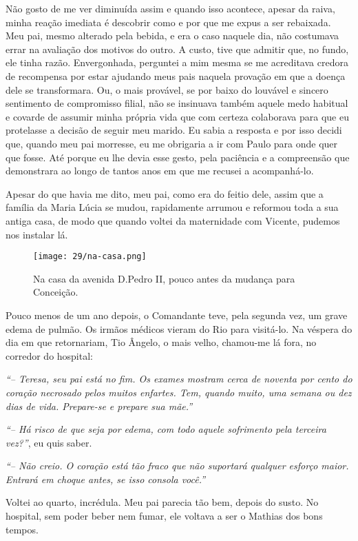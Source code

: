 Não gosto de me ver diminuída assim e quando isso acontece, apesar da raiva, minha reação imediata é descobrir como e por que me expus a ser rebaixada.
Meu pai, mesmo alterado pela bebida, e era o caso naquele dia, não costumava errar na avaliação dos motivos do outro.
A custo, tive que admitir que, no fundo, ele tinha razão.
Envergonhada, perguntei a mim mesma se me acreditava credora de recompensa por estar ajudando meus pais naquela provação em que a doença dele se transformara.
Ou, o mais provável, se por baixo do louvável e sincero sentimento de compromisso filial, não se insinuava também aquele medo habitual e covarde de assumir minha própria vida que com certeza colaborava para que eu protelasse a decisão de seguir meu marido.
Eu sabia a resposta e por isso decidi que, quando meu pai morresse, eu me obrigaria a ir com Paulo para onde quer que fosse.
Até porque eu lhe devia esse gesto, pela paciência e a compreensão que demonstrara ao longo de tantos anos em que me recusei a acompanhá-lo.

Apesar do que havia me dito, meu pai, como era do feitio dele, assim que a família da Maria Lúcia se mudou, rapidamente arrumou e reformou toda a sua antiga casa, de modo que quando voltei da maternidade com Vicente, pudemos nos instalar lá.


\begin{figure}
\centering
\texttt{[image: 29/na-casa.png]}
\caption{Na casa da avenida D.Pedro II, pouco antes da mudança para Conceição.}
\end{figure}

Pouco menos de um ano depois, o Comandante teve, pela segunda vez, um grave edema de pulmão.
Os irmãos médicos vieram do Rio para visitá-lo.
Na véspera do dia em que retornariam, Tio Ângelo, o mais velho, chamou-me lá fora, no corredor do hospital:

\textit{``-- Teresa, seu pai está no fim.
Os exames mostram cerca de noventa por cento do coração necrosado pelos muitos enfartes.
Tem, quando muito, uma semana ou dez dias de vida.
Prepare-se e prepare sua mãe.''}

\textit{``-- Há risco de que seja por edema, com todo aquele sofrimento pela terceira vez?''}, eu quis saber.

\textit{``-- Não creio.
O coração está tão fraco que não suportará qualquer esforço maior.
Entrará em choque antes, se isso consola você.''}

Voltei ao quarto, incrédula.
Meu pai parecia tão bem, depois do susto.
No hospital, sem poder beber nem fumar, ele voltava a ser o Mathias dos bons tempos.


